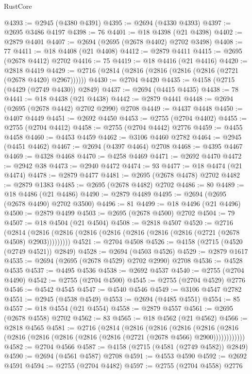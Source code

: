 \begin{lexlean}{RustCore}
\begin{coremodule}
@4393 := @2945 (@4380 @4391)
@4395 := @2694 (@4330 @4393)
@4397 := @2695 @3486 @4197
@4398 := 76
@4401 := @18 @4398 (@21 @4398)
@4402 := @2879 @4401
@4407 := @2694 (@2695 (@2678 @4402) @2702 @3498)
@4408 := 77
@4411 := @18 @4408 (@21 @4408)
@4412 := @2879 @4411
@4415 := @2695 (@2678 @4412) @2702
@4416 := 75
@4419 := @18 @4416 (@21 @4416)
@4420 := @2818 @4419
@4429 := @2716 (@2814 (@2816 (@2816 (@2816 (@2816 (@2721 (@2678 @4420) @2967))))))
@4430 := @2704 @4420
@4435 := @4158 (@2715 (@4429 (@2749 @4430)) @2849)
@4437 := @2694 (@4415 @4435)
@4438 := 78
@4441 := @18 @4438 (@21 @4438)
@4442 := @2879 @4441
@4448 := @2694 (@2695 (@2678 @4442) @2702 @2990) @2708
@4449 := @4437 @4448
@4450 := @4407 @4449
@4451 := @2692 @4450
@4453 := @2755 (@2704 @4402)
@4455 := @2755 (@2704 @4412)
@4458 := @2755 (@2704 @4442) @2776
@4459 := @4455 @4458
@4460 := @4453 @4459
@4462 := @3106 @4460 @2782
@4464 := @2945 (@4451 @4462)
@4467 := @2694 (@4397 @4464) @2708
@4468 := @4395 @4467
@4469 := @4328 @4468
@4470 := @4258 @4469
@4471 := @2692 @4470
@4472 := @2942 @38
@4473 := @2940 @4472
@4474 := 93
@4477 := @18 @4474 (@21 @4474)
@4478 := @2879 @4477
@4481 := @2695 (@2678 @4478) @2702
@4482 := @2879 @1383
@4485 := @2695 (@2678 @4482) @2702
@4486 := 80
@4489 := @18 @4486 (@21 @4486)
@4490 := @2879 @4489
@4495 := @2694 (@2695 (@2678 @4490) @2702 @3500)
@4496 := 81
@4499 := @18 @4496 (@21 @4496)
@4500 := @2879 @4499
@4503 := @2695 (@2678 @4500) @2702
@4504 := 79
@4507 := @18 @4504 (@21 @4504)
@4508 := @2818 @4507
@4520 := @2716
    (@2814 (@2816 (@2816 (@2816 (@2816 (@2816 (@2816 (@2816 (@2721 (@2678 @4508) @2903)))))))))
@4521 := @2704 @4508
@4526 := @4158 (@2715 (@4520 (@2749 @4521)) @2849)
@4528 := @2694 (@4503 @4526)
@4529 := @2879 @1617
@4535 := @2694 (@2695 (@2678 @4529) @2702 @2990) @2708
@4536 := @4528 @4535
@4537 := @4495 @4536
@4538 := @2692 @4537
@4540 := @2755 (@2704 @4490)
@4542 := @2755 (@2704 @4500)
@4545 := @2755 (@2704 @4529) @2776
@4546 := @4542 @4545
@4547 := @4540 @4546
@4549 := @3106 @4547 @2782
@4551 := @2945 (@4538 @4549)
@4553 := @2694 (@4485 @4551)
@4554 := 85
@4557 := @18 @4554 (@21 @4554)
@4558 := @2879 @4557
@4561 := @2695 (@2678 @4558) @2702
@4562 := 83
@4565 := @18 @4562 (@21 @4562)
@4566 := @2818 @4565
@4581 := @2716
    (@2814
      (@2816
        (@2816
          (@2816
            (@2816 (@2816 (@2816 (@2816 (@2816 (@2816 (@2816 (@2721 (@2678 @4566) @2900))))))))))))
@4582 := @2704 @4566
@4587 := @4158 (@2715 (@4581 (@2749 @4582)) @2849)
@4590 := @2694 (@4561 @4587) @2708
@4591 := @4553 @4590
@4592 := @2692 @4591
@4594 := @2755 (@2704 @4482)
@4597 := @2755 (@2704 @4558) @2776

\end{coremodule}
\end{lexlean}
